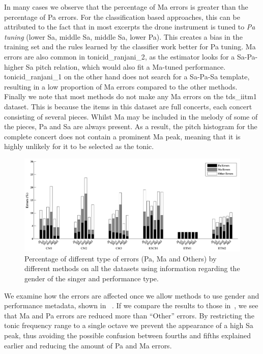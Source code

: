 {In many cases we observe that the percentage of Ma errors is greater than the percentage of Pa errors. For the classification based approaches, this can be
attributed to the fact that in most excerpts the drone instrument is tuned to \textit{Pa tuning} (lower Sa, middle Sa, middle Sa, lower Pa). This creates a
bias in the training set and the rules learned by the classifier work better for Pa tuning. Ma errors are also common in \acrshort{tonicid_ranjani_2}, as the estimator looks for a Sa-Pa-higher Sa pitch relation, which would also fit a Ma-tuned performance. \acrshort{tonicid_ranjani_1} on the other hand does not search for a Sa-Pa-Sa template, resulting in a low proportion of Ma errors compared to the other methods. Finally we note that most methods do not make any Ma errors on the \acrshort{tds_iitm1} dataset. This is because the items in this dataset are full concerts, each concert consisting of several pieces. Whilst Ma may be included in the melody of some of the pieces, Pa and Sa are always present. As a result, the pitch histogram for the complete concert does not contain a prominent Ma peak, meaning that it is highly unlikely for it to be selected as the tonic.

\begin{figure}
	\begin{center}
		\includegraphics[width=\figSizeHundred]{ch05_preprocessing/figures/ErrorAnalysis_With_MF.pdf}
	\end{center}
	\caption{Percentage of different type of errors (Pa, Ma  and Others) by different methods on all the datasets using information regarding the gender of the singer and performance type. }
	\label{fig:tonic_identification_errors_with_MF}
\end{figure}

We examine how the errors are affected once we allow methods to use gender and performance metadata, shown in ~. If we compare the results to those in~, we see
that Ma and Pa errors are reduced more than ``Other'' errors. By restricting the tonic frequency range to a single octave we prevent the
appearance of a high Sa peak, thus avoiding the possible confusion between fourths and fifths explained earlier and reducing the amount of Pa and Ma errors.

}
